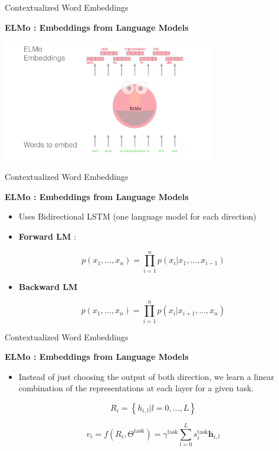 \documentclass[aspectratio=169]{beamer}
\begin{document}
\begin{frame}{Contextualized Word Embeddings}

\centering
\textbf{ELMo : Embeddings from Language Models \cite{peters2018deep}}
\vspace{.3cm}

\includegraphics[width=0.7\textwidth]{figures/elmo-word-embedding}

\end{frame}

\begin{frame}{Contextualized Word Embeddings}

\centering
\textbf{ELMo : Embeddings from Language Models \cite{peters2018deep}}
\vspace{.3cm}

\begin{itemize}
	\item Uses Bidirectional LSTM (one language model for each direction)
	\vspace{.2cm}
	\item \textbf{Forward LM} : 
\end{itemize}

$$
p(x_1, \dots, x_n) = \prod_{i=1}^n p(x_i | x_1, \dots, x_{i-1})
$$

\begin{itemize}
	\item \textbf{Backward LM}
\end{itemize}

$$
p(x_1, \dots, x_n) = \prod_{i=1}^n p(x_i | x_{i+1}, \dots, x_n)
$$

\end{frame}

\begin{frame}{Contextualized Word Embeddings}

\centering
\textbf{ELMo : Embeddings from Language Models \cite{peters2018deep}}
\vspace{.3cm}

\begin{itemize}
	\item Instead of just choosing  the output of both direction, we learn a linear combination of the representations at each layer for a given task.
\end{itemize}

$$
R_i = \left\{ h_{i, l} | l = 0, \dots, L \right\}
$$

$$
v_i = f(R_i, \Theta^{\mathrm{task}}) = \gamma^{\mathrm{task}} \sum_{l=0} ^L s_i ^{\mathrm{task}} \mathbf{h}_{i, l} 
$$

\end{frame}
\end{document}
